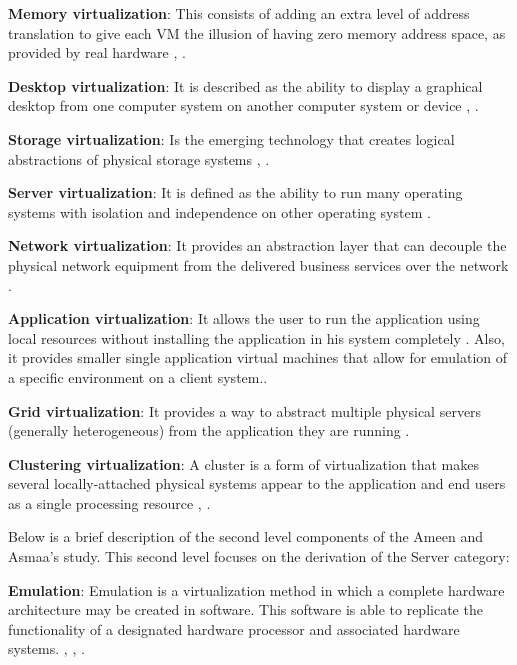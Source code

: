     \textbf{Memory virtualization}: This consists of adding an extra level of address translation to give each VM the illusion of having zero memory address space, as provided by real hardware \cite{Ameen2013}, \cite{Waldspurger2002}.
    
    \textbf{Desktop virtualization}: It is described as the ability to display a graphical desktop from one computer system on another computer system or device \cite{Ameen2013}, \cite{VonHagen2008}.
    
    \textbf{Storage virtualization}: Is the emerging technology that creates logical abstractions of physical storage systems \cite{Ameen2013}, \cite{Bigang2005}.
    
    \textbf{Server virtualization}: It is defined as the ability to run many operating systems with isolation and independence on other operating system \cite{Ameen2013}.
    
    \textbf{Network virtualization}: It provides an abstraction layer that can decouple the physical network equipment from the delivered business services over the network \cite{Annapareddy2011}.
    
    \textbf{Application virtualization}: It allows the user to run the application using local resources without installing the application in his system completely \cite{Annapareddy2011}. Also, it provides smaller single application virtual machines that allow for emulation of a specific environment on a client system.\cite{White2010}.
    
    \textbf{Grid virtualization}: It provides a way to abstract multiple physical servers (generally heterogeneous) from the application they are running \cite{Mann2006}.
    
    \textbf{Clustering virtualization}: A cluster is a form of virtualization that makes several locally-attached physical systems appear to the application and end users as a single processing resource \cite{Ameen2013}, \cite{Mann2006}.
    
    Below is a brief description of the second level components of the Ameen and Asmaa's study. This second level focuses on the derivation of the Server category:
    
    \textbf{Emulation}: Emulation is a virtualization method in which a complete hardware architecture may be created in software. This software is able to replicate the functionality of a designated hardware processor and associated hardware systems. \cite{Mann2006}, \cite{Chiueh2005}, \cite{VonHagen2008}.

